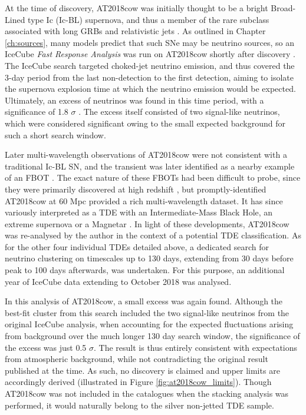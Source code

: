 At the time of discovery, AT2018cow was initially thought to be a bright Broad-Lined type Ic (Ic-BL) supernova, and thus a member of the rare subclass associated with long GRBs and relativistic jets . As outlined in Chapter \ref{ch:sources}, many models predict that such SNe may be neutrino sources, so an IceCube \emph{Fast Response Analysis} was run on AT2018cow shortly after discovery . The IceCube search targeted choked-jet neutrino emission, and thus covered the 3-day period from the last non-detection to the first detection, aiming to isolate the supernova explosion time at which the neutrino emission would be expected. Ultimately, an excess of neutrinos was found in this time period, with a significance of 1.8 $\sigma$ . The excess itself consisted of two signal-like neutrinos, which were considered significant owing to the small expected background for such a short search window.

Later multi-wavelength observations of AT2018cow were not consistent with a traditional Ic-BL SN, and the transient was later identified as a nearby example of an FBOT . The exact nature of these FBOTs had been difficult to probe, since they were primarily discovered at high redshift \cite{drout_fbot}, but promptly-identified AT2018cow at 60 Mpc provided a rich multi-wavelength dataset. It has since variously interpreted as a TDE with an Intermediate-Mass Black Hole, an extreme supernova or a Magnetar . In light of these developments, AT2018cow was re-analysed by the author in the context of a potential TDE classification. As for the other four individual TDEs detailed above, a dedicated search for neutrino clustering on timescales up to 130 days, extending from 30 days before peak to 100 days afterwards, was undertaken.  For this purpose, an additional year of IceCube data extending to October 2018 was analysed.

In this analysis of AT2018cow, a small excess was again found. Although the best-fit cluster from this search included the two signal-like neutrinos from the original IceCube analysis, when accounting for the expected fluctuations arising from background over the much longer 130 day search window, the significance of the excess was just 0.5 $\sigma$. The result is thus entirely consistent with expectations from atmospheric background, while not contradicting the original result published at the time. As such, no discovery is claimed and upper limits are accordingly derived (illustrated in Figure \ref{fig:at2018cow_limits}). Though AT2018cow was not included in the catalogues when the stacking analysis was performed, it would naturally belong to the silver non-jetted TDE sample. 

